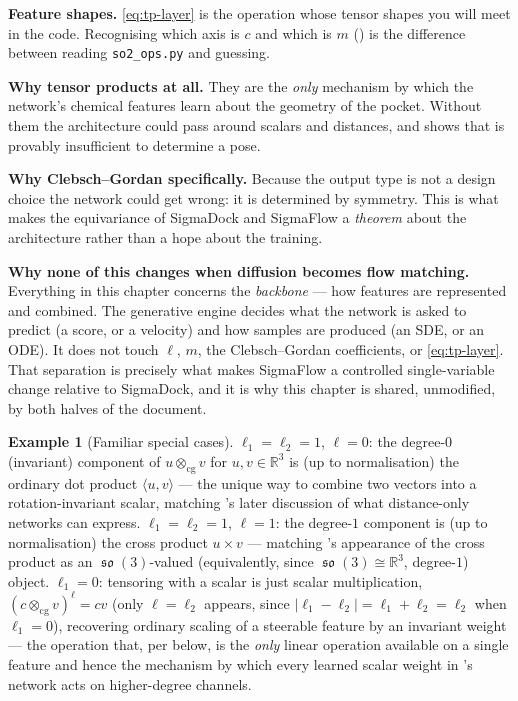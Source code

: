 \documentclass[11pt,a4paper]{report}
\theoremstyle{definition}
\newtheorem{example}[example]{Example}
\theoremstyle{remark}
\DeclareMathOperator{\so}{\mathfrak{so}}
\newcommand{\RR}{\mathbb R}
\newcommand{\file}[1]{\texttt{#1}}
\begin{document}
\begin{tcolorbox}[colback=blue!3,colframe=blue!40!black,title=Why this matters for SigmaFlow]
\textbf{Feature shapes.} \eqref{eq:tp-layer} is the operation whose tensor
shapes you will meet in the code. Recognising which axis is $c$ and which is
$m$ () is the difference between reading
\file{so2\_ops.py} and guessing.

\textbf{Why tensor products at all.} They are the \emph{only} mechanism by
which the network's chemical features learn about the geometry of the
pocket. Without them the architecture could pass around scalars and
distances, and  shows that is
provably insufficient to determine a pose.

\textbf{Why Clebsch--Gordan specifically.} Because the output type is not a
design choice the network could get wrong: it is determined by symmetry.
This is what makes the equivariance of SigmaDock and SigmaFlow a
\emph{theorem} about the architecture rather than a hope about the training.

\textbf{Why none of this changes when diffusion becomes flow matching.}
Everything in this chapter concerns the \emph{backbone} --- how features are
represented and combined. The generative engine decides what the network is
asked to predict (a score, or a velocity) and how samples are produced (an
SDE, or an ODE). It does not touch $\ell$, $m$, the Clebsch--Gordan
coefficients, or \eqref{eq:tp-layer}. That separation is precisely what
makes SigmaFlow a controlled single-variable change relative to SigmaDock,
and it is why this chapter is shared, unmodified, by both halves of the
document.
\end{tcolorbox}

\begin{example}[Familiar special cases]
\label{ex:cg-special-cases}
$\ell_1=\ell_2=1$, $\ell=0$: the degree-$0$ (invariant) component of
$u\otimes_{\mathrm{cg}}v$ for $u,v\in\RR^3$ is (up to normalisation) the
ordinary dot product $\langle u,v\rangle$ --- the unique way to combine two
vectors into a rotation-invariant scalar, matching
's later discussion of what
distance-only networks can express. $\ell_1=\ell_2=1$, $\ell=1$: the
degree-$1$ component is (up to normalisation) the cross product $u\times v$
--- matching 's appearance of the cross product as an
$\so(3)$-valued (equivalently, since $\so(3)\cong\RR^3$, degree-$1$) object.
$\ell_1=0$: tensoring with a scalar is just scalar multiplication,
$(c\otimes_{\mathrm{cg}}v)^\ell = cv$ (only $\ell=\ell_2$ appears, since
$|\ell_1-\ell_2|=\ell_1+\ell_2=\ell_2$ when $\ell_1=0$), recovering ordinary
scaling of a steerable feature by an invariant weight --- the operation
that, per  below, is the \emph{only} linear
operation available on a single feature and hence the mechanism by which
every learned scalar weight in 's network acts on
higher-degree channels.
\end{example}
\end{document}
